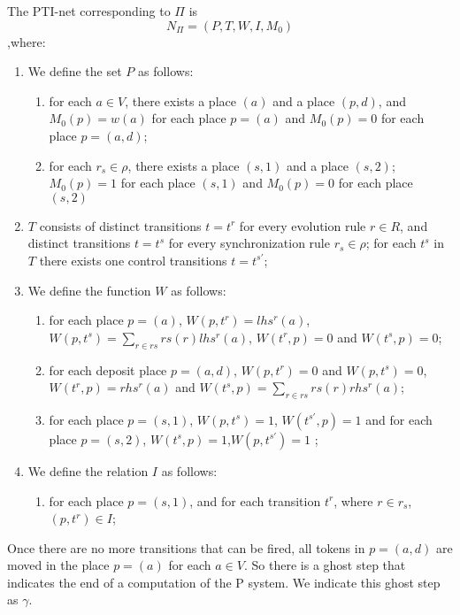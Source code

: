 \begin{definition}
The PTI-net corresponding to $\Pi$ is 
\[ N_\Pi = (P,T,W,I,M_0) \]
,where:

\begin{enumerate}
  
  \item We define the set $P$ as follows:
  \begin{enumerate}
     \item for each $a \in V$, there exists a place $(a)$ and a place $(p,d)$, and 
     $M_0(p)=w(a)$ for each place $p=(a)$ and $M_0(p)=0$ for each place $p=(a,d)$;
     \item for each $r_s \in \rho$, there exists a place $(s,1)$ and a place $(s,2)$;
     $M_0(p)=1$ for each place $(s,1)$ and $M_0(p)=0$ for each place $(s,2)$
    \end{enumerate}
    
    \item $T$ consists of distinct transitions $t=t^r$ for every evolution rule $r \in R$, and 
    distinct transitions $t=t^s$ for every synchronization rule $r_s \in \rho$;
    for each $t^s$ in $T$ there exists one control transitions $t=t^{s'}$;
    
    \item We define the function $W$ as follows:
    \begin{enumerate}
        \item for each place $p=(a)$, $W(p,t^r)=lhs^r(a)$, $W(p,t^s)=\sum_{r \in rs} rs(r)lhs^r(a)$, $W(t^r,p)=0$ and $W(t^s,p)=0$;
        \item for each deposit place $p=(a,d)$, $W(p,t^r)=0$ and $W(p,t^s)=0$, $W(t^r,p)=rhs^r(a)$ and $W(t^s,p)=\sum_{r \in rs} rs(r)rhs^r(a)$;
        \item for each place $p=(s,1)$, $W(p,t^s)=1$, $W(t^{s'},p)=1$ and for each place $p=(s,2)$, $W(t^s,p)=1$,$W(p,t^{s'})=1$ ;
    \end{enumerate}

    \item We define the relation $I$ as follows:
    \begin{enumerate}
        \item for each place $p=(s,1)$, and for each transition $t^r$, where $r \in r_s$, 
        $(p,t^r) \in I$;
    \end{enumerate}
    
\end{enumerate}
\end{definition}

Once there are no more transitions that can be fired, all tokens in $p=(a,d)$ are moved in the place $p=(a)$ for each $a \in V$. So there is a ghost step that indicates the end of a computation of the P system. 
We indicate this ghost step as $\gamma$.
